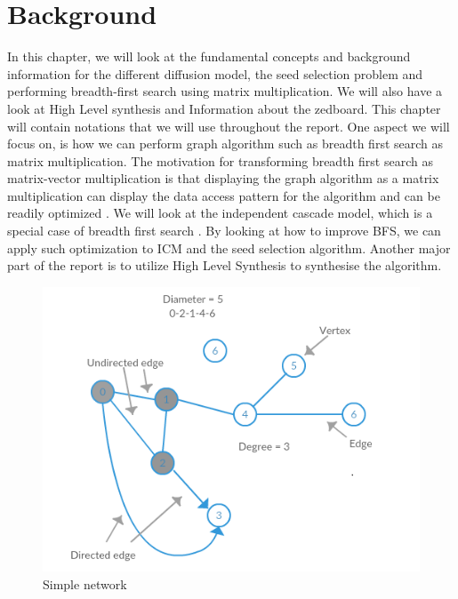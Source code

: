 \chapter{Background} \label{background}

In this chapter, we will look at the fundamental concepts and background information for the different diffusion model, the seed selection problem and performing breadth-first search using matrix multiplication. We will also have a look at High Level synthesis and Information about the zedboard. This chapter will contain notations that we will use throughout the report. One aspect we will focus on, is how we can perform graph algorithm such as breadth first search as matrix multiplication. The motivation for transforming breadth first search as matrix-vector multiplication is that displaying the graph algorithm as a matrix multiplication can display the data access pattern for the algorithm and can be readily optimized  \cite{AlgoToMath}. We will look at the independent cascade model, which is a special case of breadth first search  \cite{HybridBFS2015}. By looking at how to improve BFS, we can apply such optimization to ICM and the seed selection algorithm. Another major part of the report is to utilize High Level Synthesis to synthesise the algorithm. \\

\begin{figure}[!ht]
	\includegraphics[scale=0.7]{Figures/smallExampleNetwork2}
	\caption{Simple network} 
	\label{fig:SimpleGraph}
\end{figure}

